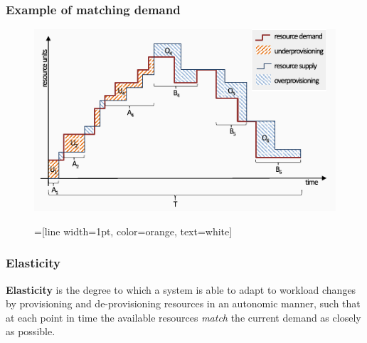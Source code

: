 \documentclass{beamer}
\begin{document}
\begin{frame}
  \frametitle{Example of matching demand~\cite{herbst2013elasticity}}
  \begin{figure}
    \includegraphics[clip, width=\textwidth]{images/workload}
  \end{figure}
\end{frame}

\begin{frame}
\begin{figure}
=[line width=1pt, color=orange, text=white]
\def\firstcircle{(-2.85,0) circle (1.5cm)}
\def\secondcircle{(0,2.85) circle (1.5cm)}
\def\thirdcircle{(2.85,0) circle (1.5cm)}
\def\bigcircle{(0,1) ellipse (5.5cm and 3.5cm)}
\end{figure}
\end{frame}

\begin{frame}
  \frametitle{Elasticity~\cite{herbst2013elasticity}~\cite{galante2012survey}~\cite{gulati2011cloud}}
  \begin{definition}
  \parbox{\linewidth}{\textbf{Elasticity} is the degree to which a system is able to adapt to workload changes by provisioning and de-provisioning resources in an autonomic manner, such that at each point in time the available resources \textit{match} the current demand as closely as possible.}
  \end{definition}
\end{frame}
\end{document}
